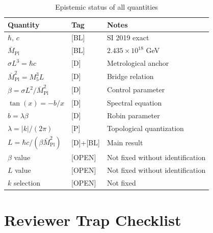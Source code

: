 \documentclass[11pt,a4paper]{article}
\begin{document}
\begin{table}[h]
\centering
\caption{Epistemic status of all quantities}
\label{tab:ledger}
\begin{tabular}{llp{6cm}}
\toprule
Quantity & Tag & Notes \\
\midrule
$\hbar$, $c$ & [BL] & SI 2019 exact \\
$\bar{M}_{\text{Pl}}$ & [BL] & $2.435 \times 10^{18}$ GeV \\
$\sigma L^3 = \hbar c$ & [D] & Metrological anchor \\
$\bar{M}_{\text{Pl}}^2 = M_5^3 L$ & [D] & Bridge relation \\
$\beta = \sigma L^2 / \bar{M}_{\text{Pl}}^2$ & [D] & Control parameter \\
$\tan(x) = -b/x$ & [D] & Spectral equation \\
$b = \lambda \beta$ & [D] & Robin parameter \\
$\lambda = |k|/(2\pi)$ & [P] & Topological quantization \\
$L = \hbar c / (\beta \bar{M}_{\text{Pl}}^2)$ & [D]+[BL] & Main result \\
$\beta$ value & [OPEN] & Not fixed without identification \\
$L$ value & [OPEN] & Not fixed without identification \\
$k$ selection & [OPEN] & Not fixed \\
\bottomrule
\end{tabular}
\end{table}

\section{Reviewer Trap Checklist}
\label{sec:traps}
\end{document}
